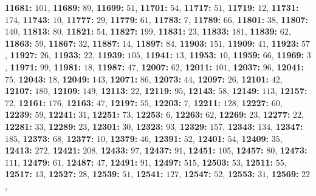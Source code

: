 \textsf{\bfseries 11681:} $101$, \textsf{\bfseries 11689:} $89$, \textsf{\bfseries 11699:} $51$, \textsf{\bfseries 11701:} $54$, \textsf{\bfseries 11717:} $51$, \textsf{\bfseries 11719:} $12$, \textsf{\bfseries 11731:} $174$, \textsf{\bfseries 11743:} $10$, \textsf{\bfseries 11777:} $29$, \textsf{\bfseries 11779:} $61$, \textsf{\bfseries 11783:} $7$, \textsf{\bfseries 11789:} $66$, \textsf{\bfseries 11801:} $38$, \textsf{\bfseries 11807:} $140$, \textsf{\bfseries 11813:} $80$, \textsf{\bfseries 11821:} $54$, \textsf{\bfseries 11827:} $199$, \textsf{\bfseries 11831:} $23$, \textsf{\bfseries 11833:} $181$, \textsf{\bfseries 11839:} $62$, \textsf{\bfseries 11863:} $59$, \textsf{\bfseries 11867:} $32$, \textsf{\bfseries 11887:} $14$, \textsf{\bfseries 11897:} $84$, \textsf{\bfseries 11903:} $151$, \textsf{\bfseries 11909:} $41$, \textsf{\bfseries 11923:} $57$, \textsf{\bfseries 11927:} $26$, \textsf{\bfseries 11933:} $22$, \textsf{\bfseries 11939:} $105$, \textsf{\bfseries 11941:} $13$, \textsf{\bfseries 11953:} $10$, \textsf{\bfseries 11959:} $66$, \textsf{\bfseries 11969:} $3$, \textsf{\bfseries 11971:} $99$, \textsf{\bfseries 11981:} $18$, \textsf{\bfseries 11987:} $47$, \textsf{\bfseries 12007:} $62$, \textsf{\bfseries 12011:} $101$, \textsf{\bfseries 12037:} $96$, \textsf{\bfseries 12041:} $75$, \textsf{\bfseries 12043:} $18$, \textsf{\bfseries 12049:} $143$, \textsf{\bfseries 12071:} $86$, \textsf{\bfseries 12073:} $44$, \textsf{\bfseries 12097:} $26$, \textsf{\bfseries 12101:} $42$, \textsf{\bfseries 12107:} $180$, \textsf{\bfseries 12109:} $149$, \textsf{\bfseries 12113:} $22$, \textsf{\bfseries 12119:} $95$, \textsf{\bfseries 12143:} $58$, \textsf{\bfseries 12149:} $113$, \textsf{\bfseries 12157:} $72$, \textsf{\bfseries 12161:} $176$, \textsf{\bfseries 12163:} $47$, \textsf{\bfseries 12197:} $55$, \textsf{\bfseries 12203:} $7$, \textsf{\bfseries 12211:} $128$, \textsf{\bfseries 12227:} $60$, \textsf{\bfseries 12239:} $59$, \textsf{\bfseries 12241:} $31$, \textsf{\bfseries 12251:} $73$, \textsf{\bfseries 12253:} $6$, \textsf{\bfseries 12263:} $62$, \textsf{\bfseries 12269:} $23$, \textsf{\bfseries 12277:} $22$, \textsf{\bfseries 12281:} $33$, \textsf{\bfseries 12289:} $23$, \textsf{\bfseries 12301:} $30$, \textsf{\bfseries 12323:} $93$, \textsf{\bfseries 12329:} $157$, \textsf{\bfseries 12343:} $134$, \textsf{\bfseries 12347:} $185$, \textsf{\bfseries 12373:} $68$, \textsf{\bfseries 12377:} $10$, \textsf{\bfseries 12379:} $46$, \textsf{\bfseries 12391:} $52$, \textsf{\bfseries 12401:} $54$, \textsf{\bfseries 12409:} $35$, \textsf{\bfseries 12413:} $272$, \textsf{\bfseries 12421:} $208$, \textsf{\bfseries 12433:} $97$, \textsf{\bfseries 12437:} $91$, \textsf{\bfseries 12451:} $105$, \textsf{\bfseries 12457:} $80$, \textsf{\bfseries 12473:} $111$, \textsf{\bfseries 12479:} $61$, \textsf{\bfseries 12487:} $47$, \textsf{\bfseries 12491:} $91$, \textsf{\bfseries 12497:} $515$, \textsf{\bfseries 12503:} $53$, \textsf{\bfseries 12511:} $55$, \textsf{\bfseries 12517:} $13$, \textsf{\bfseries 12527:} $28$, \textsf{\bfseries 12539:} $51$, \textsf{\bfseries 12541:} $127$, \textsf{\bfseries 12547:} $52$, \textsf{\bfseries 12553:} $31$, \textsf{\bfseries 12569:} $22$, 
